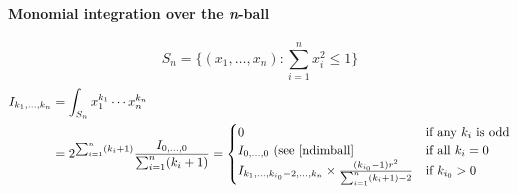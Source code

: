 \documentclass{scrartcl}
\begin{document}
\paragraph{Monomial integration over the \textit{n}-ball}
\cite{folland}
\[
  S_n = \{(x_1,\dots,x_n): \sum_{i=1}^n x_i^2 \le 1\}
\]
\[
  \begin{split}
    I_{k_1,\dots,k_n}
    &= \int_{S_n} x_1^{k_1}\cdots x_n^{k_n}\\
    &= 2^{\sum_{i=1}^n (k_i+1)} \frac{I_{0,\dots,0}}{\sum_{i=1}^n (k_i+1)}
    =\begin{cases}
      0&\text{if any $k_i$ is odd}\\
      I_{0,\dots,0} \text{ (see \eqref{ndimball}}&\text{if all $k_i=0$}\\
      I_{k_1,\dots,k_{i_0}-2,\dots,k_n} \times \frac{(k_{i_0} - 1) r^2}{\sum_{i=1}^n (k_i+1) - 2}&\text{if $k_{i_0} > 0$}
    \end{cases}
  \end{split}
\]

{}

\end{document}
